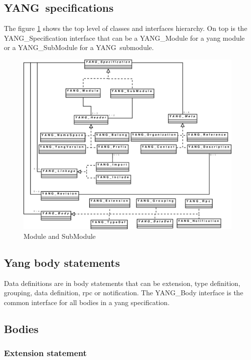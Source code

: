 \documentclass[a4paper]{article}
\newcommand{\y}{YANG}
\begin{document}
\subsection{\y\ specifications}

The figure  \ref{spec} shows the  top level of classes  and interfaces
hierarchy.  On top is the  YANG\_Specification interface that can be a
YANG\_Module  for  a  yang  module  or a  YANG\_SubModule  for  a  \y\
submodule.

\begin{figure}[htbp]
\begin{center}
\includegraphics[scale = .3]{yspec.eps}
\end{center}
\caption{Module and SubModule}
\label{spec}
\end{figure}

\subsection{Yang body statements}

Data definitions  are in body  statements that can be  extension, type
definition,  grouping,  data  definition,  rpc or  notification.   The
YANG\_Body interface is the common  interface for all bodies in a yang
specification.

\subsection{Bodies}

\subsubsection{Extension statement}
\label{extension:section:global}
\end{document}
